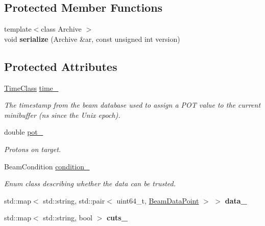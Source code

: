 \subsection*{Protected Member Functions}
\begin{DoxyCompactItemize}
\item 
\hypertarget{classBeamStatus_a20411754c151c9e8afc6fc7e215a3475}{
{\footnotesize template$<$class Archive $>$ }\\void {\bfseries serialize} (Archive \&ar, const unsigned int version)}
\label{classBeamStatus_a20411754c151c9e8afc6fc7e215a3475}

\end{DoxyCompactItemize}
\subsection*{Protected Attributes}
\begin{DoxyCompactItemize}
\item 
\hyperlink{classTimeClass}{TimeClass} \hyperlink{classBeamStatus_a499b220ec0c80ce883d19f8f9520934d}{time\_\-}
\begin{DoxyCompactList}\small\item\em The timestamp from the beam database used to assign a POT value to the current minibuffer (ns since the Unix epoch). \item\end{DoxyCompactList}\item 
\hypertarget{classBeamStatus_ab4d86e7e924a02a73324105931e5bdc5}{
double \hyperlink{classBeamStatus_ab4d86e7e924a02a73324105931e5bdc5}{pot\_\-}}
\label{classBeamStatus_ab4d86e7e924a02a73324105931e5bdc5}

\begin{DoxyCompactList}\small\item\em Protons on target. \item\end{DoxyCompactList}\item 
BeamCondition \hyperlink{classBeamStatus_a8e81a7fca77f64c2ce0e41bd0e14c3ea}{condition\_\-}
\begin{DoxyCompactList}\small\item\em Enum class describing whether the data can be trusted. \item\end{DoxyCompactList}\item 
\hypertarget{classBeamStatus_a784e81454e78fc90f3c8206d68cae144}{
std::map$<$ std::string, std::pair$<$ uint64\_\-t, \hyperlink{structBeamDataPoint}{BeamDataPoint} $>$ $>$ {\bfseries data\_\-}}
\label{classBeamStatus_a784e81454e78fc90f3c8206d68cae144}

\item 
\hypertarget{classBeamStatus_aff0365d2d921712d77e96fabfbcebdc3}{
std::map$<$ std::string, bool $>$ {\bfseries cuts\_\-}}
\label{classBeamStatus_aff0365d2d921712d77e96fabfbcebdc3}

\end{DoxyCompactItemize}
